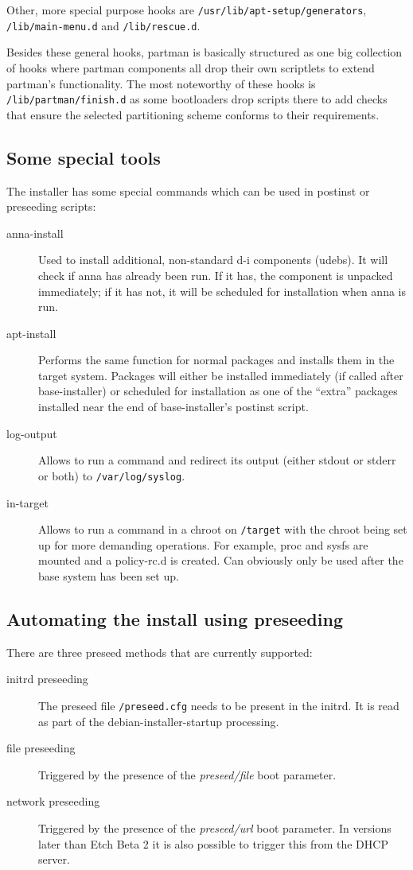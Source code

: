 \documentclass[a4paper,10pt]{article}
\begin{document}
Other, more special purpose hooks are \texttt{/usr/lib/apt-setup/generators}, \texttt{/lib/main-menu.d} and \texttt{/lib/rescue.d}. 

Besides these general hooks, partman is basically structured as one big collection of hooks where partman components all drop their own scriptlets to extend partman's functionality. The most noteworthy of these hooks is \texttt{/lib/partman/finish.d} as some bootloaders drop scripts there to add checks that ensure the selected partitioning scheme conforms to their requirements. 


\subsection{Some special tools}
The installer has some special commands which can be used in postinst or preseeding scripts: 

\begin{description}
\item[anna-install]
Used to install additional, non-standard d-i components (udebs). It will check if anna has already been run. If it has, the component is unpacked immediately; if it has not, it will be scheduled for installation when anna is run.
\item[apt-install]
Performs the same function for normal packages and installs them in the target system. Packages will either be installed immediately (if called after base-installer) or scheduled for installation as one of the “extra” packages installed near the end of base-installer's postinst script.
\item[log-output]
Allows to run a command and redirect its output (either stdout or stderr or both) to \texttt{/var/log/syslog}. 
\item[in-target]
Allows to run a command in a chroot on \texttt{/target} with the chroot being set up for more demanding operations. For example, proc and sysfs are mounted and a policy-rc.d is created. Can obviously only be used after the base system has been set up. 
\end{description}


\subsection{Automating the install using preseeding}
There are three preseed methods that are currently supported: 

\begin{description}
\item[initrd preseeding]
The preseed file \texttt{/preseed.cfg} needs to be present in the initrd. It is read as part of the debian-installer-startup processing. 
\item[file preseeding]
Triggered by the presence of the \textit{preseed/file} boot parameter.
\item[network preseeding]
Triggered by the presence of the \textit{preseed/url} boot parameter. In versions later than Etch Beta 2 it is also possible to trigger this from the DHCP server. 
\end{description}
\end{document}
